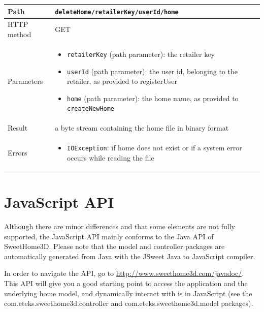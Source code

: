 \documentclass[a4paper]{report}
\begin{document}
\begin{center}
\begin{tabularx} {\textwidth} { | l | X | }

\hline

Path & \texttt{deleteHome/retailerKey/userId/home} \\

\hline

HTTP method & GET \\

\hline

Parameters & \begin{itemize}[leftmargin=*,noitemsep,topsep=0px]
\item \texttt{retailerKey} (path parameter): the retailer key
\item \texttt{userId} (path parameter): the user id, belonging to the retailer, as provided to registerUser 
\item \texttt{home} (path parameter): the home name, as provided to \texttt{createNewHome}
\end{itemize} \\

\hline

Result & a byte stream containing the home file in binary format \\

\hline

Errors & \begin{itemize}[leftmargin=*,noitemsep,topsep=0px]
\item \texttt{IOException}: if home does not exist or if a system error occurs while reading the file
\end{itemize} \\

\hline

\end{tabularx}
\end{center}
    
     
 \section{JavaScript API}

Although there are minor differences and that some elements are not fully supported, the JavaScript API mainly conforms to the Java API of SweetHome3D. Please note that the model and controller packages are automatically generated from Java with the JSweet Java to JavaScript compiler.

In order to navigate the API, go to \url{http://www.sweethome3d.com/javadoc/}. This API will give you a good starting point to access the application and the underlying home model, and dynamically interact with is in JavaScript (see the com.eteks.sweethome3d.controller and com.eteks.sweethome3d.model packages).
\end{document}
